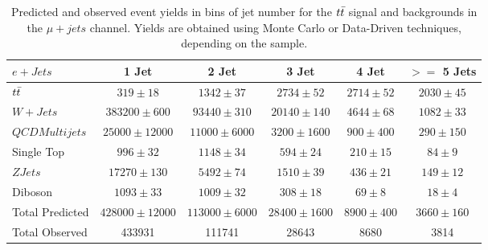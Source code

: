 \begin{table}
  \tiny
  \begin{tabular}{lccccc}
    \hline
    $e + Jets$ & 1 Jet & 2 Jet & 3 Jet & 4 Jet & $>=$ 5 Jets \\ 
    \hline
    $t\bar{t}$ & $319 \pm 18$ & $1342 \pm 37$ & $2734 \pm 52$ & $2714 \pm 52$ & $2030 \pm 45$ \\
    $W+Jets$ & $383200 \pm 600$ & $93440 \pm 310$ & $20140 \pm 140$ & $4644 \pm 68$ & $1082 \pm 33$ \\
    $QCD Multijets$ & $25000 \pm 12000$ & $11000 \pm 6000$ & $3200 \pm 1600$ & $900 \pm 400$ & $290 \pm 150$ \\
    Single Top & $996 \pm 32$ & $1148 \pm 34$ & $594 \pm 24$ & $210 \pm 15$ & $84 \pm 9$ \\
    $ZJets$ & $17270 \pm 130$ & $5492 \pm 74$ & $1510 \pm 39$ & $436 \pm 21$ & $149 \pm 12$ \\
    Diboson & $1093 \pm 33$ & $1009 \pm 32$ & $308 \pm 18$ & $69 \pm 8$ & $18 \pm 4$ \\
    \hline
    Total Predicted & $428000 \pm 12000$ & $113000 \pm 6000$ & $28400 \pm 1600$ & $8900 \pm 400$ & $3660 \pm 160$ \\
    Total Observed & 433931 & 111741 & 28643 & 8680 & 3814 \\
    \hline
  \end{tabular}
  \caption{Predicted and observed event yields in bins of jet number for the $t\bar{t}$ signal and backgrounds in the $\mu+jets$ channel.  Yields are obtained using Monte Carlo or Data-Driven techniques, depending on the sample.}
\end{table}


